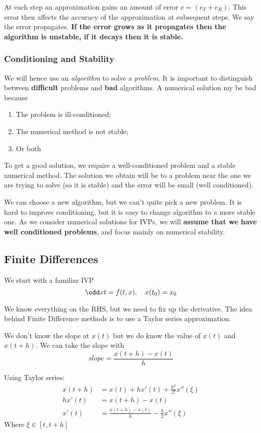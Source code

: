 \documentclass{X:/Documents/Coding/Latex/myassignment}
\begin{document}
At each step an approximation gains an amount of error $e = (e_T + e_R)$. This error then affects the accuracy of the approximation at subsequent steps. We say the error propagates.  \textbf{If the error grows as it propagates then the algorithm is unstable, if it decays then it is stable.}


\subsubsection{Conditioning and Stability}
We will hence use an \textit{algorithm} to solve a \textit{problem}. It is important to distinguish between \textbf{difficult} problems and \textbf{bad} algorithms.
A numerical solution my be bad because
\begin{enumerate}
    \item The problem is ill-conditioned;
    \item The numerical method is not stable;
    \item Or both
\end{enumerate}
To get a good solution, we require a well-conditioned problem and a stable numerical method. The solution we obtain will be to a problem near the one we are trying to solve (so it is stable) and the error will be small (well conditioned).


We can choose a new algorithm, but we can't quite pick a new problem. It is hard to improve conditioning, but it is easy to change algorithm to a more stable one. As we consider numerical solutions for IVPs, we will \textbf{assume that we have well conditioned problems}, and focus mainly on numerical stability.


\subsection{Finite Differences}
We start with a familiar IVP
\[\odd xt = f(t,x), \quad x(t_0) = x_0\]

We know everything on the RHS, but we need to fix up the derivative. The idea behind Finite Difference methods is to use a Taylor series approximation.

We don't know the slope at $x(t)$ but we do know the value of $x(t)$ and $x(t+h)$.
We can take the slope with
\[slope = \frac{x(t+h) - x(t)}{h}\]

Using Taylor series:
\begin{align*}
    x(t+h) &= x(t) + hx'(t) + \frac{h^2}{2!} x''(\xi)\\
    hx'(t) &= x(t+h)-x(t)\\
    x'(t) &= \frac{x(t+h)-x(t)}{h} - \frac{h}{2} x''(\xi)
\end{align*}
Where $\xi \in \left[t,t+h\right]$
\end{document}

